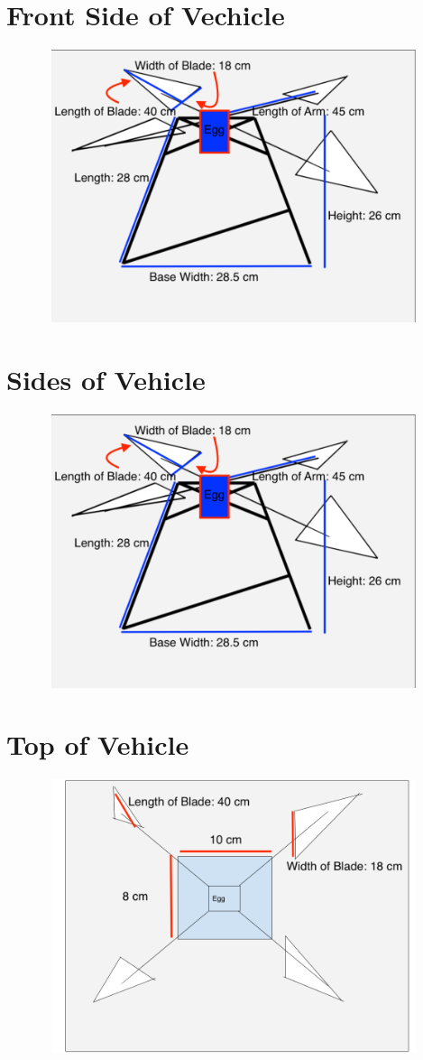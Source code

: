 \documentclass[12pt]{report}
\begin{document}
\section{Front Side of Vechicle}
\includegraphics[width=15cm, height=8cm]{egg_final}
\section{Sides of Vehicle}
\includegraphics[width=15cm, height=8cm]{egg_final}
\section{Top of Vehicle}
\includegraphics[width=15cm, height=8cm]{top_egg}
\end{document}
